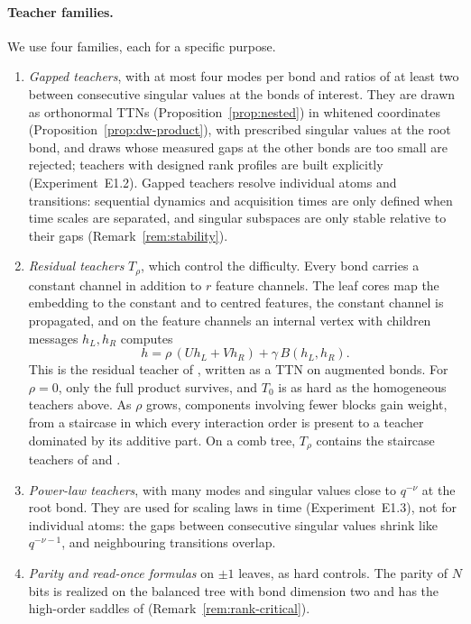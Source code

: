 \documentclass[11pt]{article}
\theoremstyle{definition}
\numberwithin{equation}{section}
\begin{document}
\paragraph{Teacher families.}
We use four families, each for a specific purpose.
\begin{enumerate}[label=(T\arabic*),leftmargin=*]
\item \emph{Gapped teachers}, with at most four modes per bond and ratios of at least two between consecutive singular values at the bonds of interest. They are drawn as orthonormal TTNs (Proposition~\ref{prop:nested}) in whitened coordinates (Proposition~\ref{prop:dw-product}), with prescribed singular values at the root bond, and draws whose measured gaps at the other bonds are too small are rejected; teachers with designed rank profiles are built explicitly (Experiment~E1.2). Gapped teachers resolve individual atoms and transitions: sequential dynamics and acquisition times are only defined when time scales are separated, and singular subspaces are only stable relative to their gaps (Remark~\ref{rem:stability}).
\item \emph{Residual teachers} $T_\rho$, which control the difficulty. Every bond carries a constant channel in addition to $r$ feature channels. The leaf cores map the embedding to the constant and to centred features, the constant channel is propagated, and on the feature channels an internal vertex with children messages $h_L,h_R$ computes
\[
h=\rho\,(Uh_L+Vh_R)+\gamma\,B(h_L,h_R).
\]
This is the residual teacher of \citet[Section~6.3]{hfl_surrogate}, written as a TTN on augmented bonds. For $\rho=0$, only the full product survives, and $T_0$ is as hard as the homogeneous teachers above. As $\rho$ grows, components involving fewer blocks gain weight, from a staircase in which every interaction order is present to a teacher dominated by its additive part. On a comb tree, $T_\rho$ contains the staircase teachers of \citet[Section~5]{hfl_diagonal} and \citet[Section~6.2]{hfl_surrogate}.
\item \emph{Power-law teachers}, with many modes and singular values close to $q^{-\nu}$ at the root bond. They are used for scaling laws in time (Experiment~E1.3), not for individual atoms: the gaps between consecutive singular values shrink like $q^{-\nu-1}$, and neighbouring transitions overlap.
\item \emph{Parity and read-once formulas} on $\pm1$ leaves, as hard controls. The parity of $N$ bits is realized on the balanced tree with bond dimension two and has the high-order saddles of \citet{furman2026benign} (Remark~\ref{rem:rank-critical}).
\end{enumerate}
\end{document}
